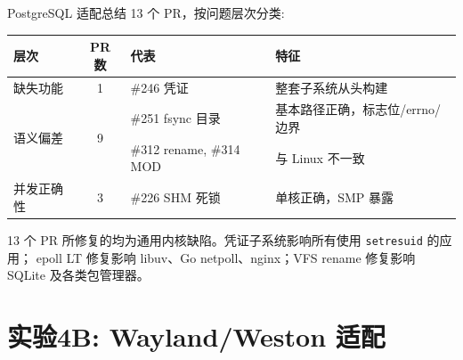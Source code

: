 \documentclass[aspectratio=169,10pt]{ctexbeamer}
\newcommand{\syscall}[1]{\texttt{#1}}
\begin{document}

\begin{frame}[shrink=20]{PostgreSQL 适配总结}
13 个 PR，按问题层次分类:

\vspace{1mm}
\begin{tabularx}{\textwidth}{p{2cm} c p{2.5cm} X}
\toprule
\textbf{层次} & \textbf{PR 数} & \textbf{代表} & \textbf{特征} \\
\midrule
缺失功能 & 1 & \#246 凭证 & 整套子系统从头构建 \\
\midrule
\multirow{2}{*}{语义偏差} & \multirow{2}{*}{9} &
  \#251 fsync 目录 & 基本路径正确，标志位/errno/边界 \\
  & & \#312 rename, \#314 MOD & 与 Linux 不一致 \\
\midrule
并发正确性 & 3 & \#226 SHM 死锁 & 单核正确，SMP 暴露 \\
\bottomrule
\end{tabularx}

\vspace{1mm}
13 个 PR 所修复的均为通用内核缺陷。凭证子系统影响所有使用 \syscall{setresuid} 的应用；
epoll LT 修复影响 libuv、Go netpoll、nginx；VFS rename 修复影响 SQLite 及各类包管理器。
\end{frame}


\section{实验4B: Wayland/Weston 适配}
\end{document}
